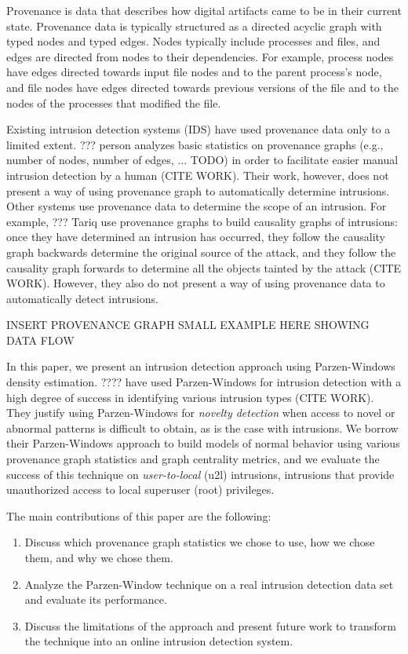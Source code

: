 \documentclass[10pt,twocolumn]{article}
\begin{document}
Provenance is data that describes how digital artifacts
came to be in their current state. Provenance data is typically structured as a directed acyclic graph with
typed nodes and typed edges.
Nodes typically include processes and files, and edges are directed from nodes to their dependencies. For example,
process nodes have edges directed towards input file nodes and to the parent process's node, and
file nodes have edges directed towards previous versions of the file and to the nodes of the
processes that modified the file.

Existing intrusion detection systems (IDS) have used provenance data only to a limited extent.
??? person analyzes
basic statistics on provenance graphs (e.g., number of nodes, number of edges, ... TODO) in order to facilitate
easier manual intrusion detection by a human (CITE WORK). Their work, however, does not present a way of using provenance
graph to automatically determine intrusions. Other systems use provenance data to determine the scope of an
intrusion. For example, ??? Tariq use provenance graphs to build causality graphs of intrusions: once they have
determined an intrusion has occurred, they follow the causality graph backwards determine the original source of the attack, and 
they follow the causality graph forwards to determine all the objects tainted by the attack (CITE WORK). However, they also
do not present a way of using provenance data to automatically detect intrusions.


INSERT PROVENANCE GRAPH SMALL EXAMPLE HERE SHOWING DATA FLOW

In this paper, we present an intrusion detection approach using Parzen-Windows density estimation. ???? have used
Parzen-Windows for intrusion detection with a high degree of success in identifying various intrusion types (CITE WORK).
They justify using Parzen-Windows for
{\em novelty detection} when access to novel or abnormal patterns is difficult to obtain, as is the case with
intrusions. We borrow their Parzen-Windows approach to build models of normal behavior using 
various provenance graph statistics and graph centrality metrics, and we evaluate the success of this technique
on {\em user-to-local} (u2l) intrusions, intrusions that provide unauthorized access to local superuser (root) privileges. 

The main contributions of this paper are the following:
\begin{enumerate}
\item Discuss which provenance graph statistics we chose to use, how we chose them, and why we chose them.
\item Analyze the Parzen-Window technique on a real intrusion detection data set and evaluate its performance.
\item Discuss the limitations of the approach and present future work to transform the technique into an online intrusion detection system.
\end{enumerate}
\end{document}
